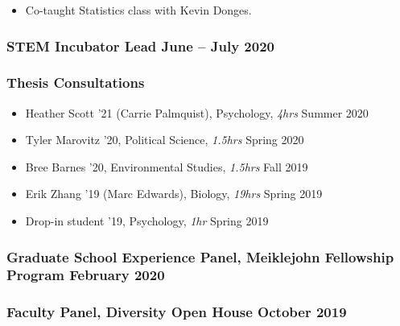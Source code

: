 \documentclass[
  fleqn, oneside]{article}
\providecommand{\tightlist}{%
  \setlength{\itemsep}{0pt}\setlength{\parskip}{0pt}}
\begin{document}
\begin{itemize}
\tightlist
\item
  Co-taught Statistics class with Kevin Donges. 
\end{itemize}

\hypertarget{stem-incubator-lead-june-july-2020}{%
\subsubsection{\texorpdfstring{STEM Incubator Lead
\hfill\normalfont June -- July
2020}{STEM Incubator Lead June -- July 2020}}\label{stem-incubator-lead-june-july-2020}}

\hypertarget{thesis-consultations}{%
\subsubsection{Thesis Consultations}\label{thesis-consultations}}

\begin{itemize}
\tightlist
\item
  Heather Scott '21 (Carrie Palmquist), Psychology, \emph{4hrs}
  \hfill Summer 2020
\item
  Tyler Marovitz '20, Political Science, \emph{1.5hrs} \hfill Spring
  2020
\item
  Bree Barnes '20, Environmental Studies, \emph{1.5hrs} \hfill Fall 2019
\item
  Erik Zhang '19 (Marc Edwards), Biology, \emph{19hrs} \hfill Spring
  2019
\item
  Drop-in student '19, Psychology, \emph{1hr} \hfill Spring 2019
\end{itemize}

\hypertarget{graduate-school-experience-panel-meiklejohn-fellowship-program-february-2020}{%
\subsubsection{\texorpdfstring{Graduate School Experience Panel,
Meiklejohn Fellowship Program \hfill\normalfont February
2020}{Graduate School Experience Panel, Meiklejohn Fellowship Program February 2020}}\label{graduate-school-experience-panel-meiklejohn-fellowship-program-february-2020}}

\hypertarget{faculty-panel-diversity-open-house-october-2019}{%
\subsubsection{\texorpdfstring{Faculty Panel, Diversity Open House
\hfill\normalfont October
2019}{Faculty Panel, Diversity Open House October 2019}}\label{faculty-panel-diversity-open-house-october-2019}}
\end{document}
